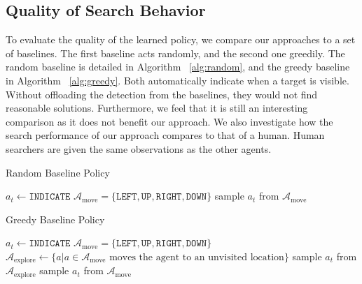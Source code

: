 \subsection{Quality of Search Behavior}

To evaluate the quality of the learned policy, we compare our approaches to a set of baselines.
The first baseline acts randomly, and the second one greedily.
The random baseline is detailed in Algorithm ~\ref{alg:random}, and the greedy baseline in Algorithm ~\ref{alg:greedy}.
Both automatically indicate when a target is visible.
Without offloading the detection from the baselines, they would not find reasonable solutions.
Furthermore, we feel that it is still an interesting comparison as it does not benefit our approach.
We also investigate how the search performance of our approach compares to that of a human.
Human searchers are given the same observations as the other agents.

\begin{algorithm}
    \label{alg:random}
    \caption{Random Baseline Policy}
    \begin{algorithmic}
            \State \(a_t \leftarrow \mathtt{INDICATE}\)
        \Else
            \State \(\mathcal{A}_{\text{move}} = \{\mathtt{LEFT}, \mathtt{UP}, \mathtt{RIGHT}, \mathtt{DOWN}\}\)
            \State sample \(a_t\) from \(\mathcal{A}_{\text{move}}\)
        \EndIf
    \end{algorithmic}
\end{algorithm}

\begin{algorithm}
    \label{alg:greedy}
    \caption{Greedy Baseline Policy}
    \begin{algorithmic}
            \State \(a_t \leftarrow \mathtt{INDICATE}\)
        \Else
            \State \(\mathcal{A}_{\text{move}} = \{\mathtt{LEFT}, \mathtt{UP}, \mathtt{RIGHT}, \mathtt{DOWN}\}\)
            \State \(\mathcal{A}_{\text{explore}} \leftarrow \{a | a \in \mathcal{A}_{\text{move}} \text{ moves the agent to an unvisited location}\}\) 
                \State sample \(a_t\) from \(\mathcal{A}_{\text{explore}}\)
            \Else
                \State sample \(a_t\) from \(\mathcal{A}_{\text{move}}\)
            \EndIf
        \EndIf
    \end{algorithmic}
\end{algorithm}

